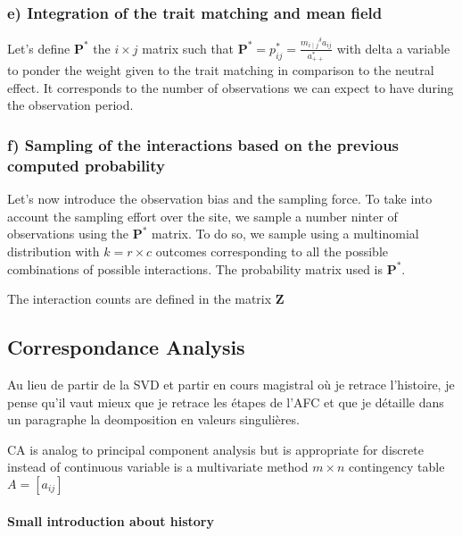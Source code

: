 \documentclass{article}
\begin{document}
\subsubsection{e) Integration of the trait matching and mean field}
Let's define $\textbf{P}^*$ the $i \times j$ matrix such that $\textbf{P}^* = p^*_{ij} = \frac{{m_{i\mid j}}^\delta a_{ij}}{a_{++}^*}$ with delta a variable to ponder the weight given to the trait matching in comparison to the neutral effect.
It corresponds to the number of observations we can expect to have during the observation period.




\subsubsection{f) Sampling of the interactions based on the previous computed probability}
Let's now introduce the observation bias and the sampling force. To take into account the sampling effort over the site, we sample a number ninter of observations using the $\textbf{P}^*$ matrix. To do so, we sample using a multinomial distribution with $k = r \times c$ outcomes corresponding to all the possible combinations of possible interactions. The probability matrix used is $\textbf{P}^*$.

The interaction counts are defined in the matrix $\textbf{Z}$









\subsection{Correspondance Analysis}

Au lieu de partir de la SVD et partir en cours magistral où je retrace l'histoire, je pense qu'il vaut mieux que je retrace les étapes de l'AFC et que je détaille dans un paragraphe la deomposition en valeurs singulières.

CA is analog to principal component analysis but is appropriate for discrete instead of continuous variable
is a multivariate method
$m\times n$ contingency table $A = [a_{ij}]$ 

\paragraph{Small introduction about history}
\end{document}
